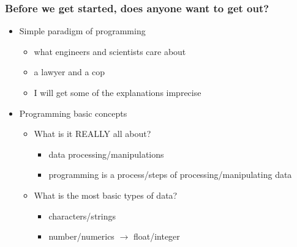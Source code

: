 \begin{frame}[fragile]
\frametitle{Before we get started, does anyone want to get out?}
\begin{itemize}
\item Simple paradigm of programming
\begin{itemize}
\item what engineers and scientists care about
\item a lawyer and a cop
\item I will get some of the explanations imprecise
\end{itemize}

\item Programming basic concepts
\begin{itemize}
\item What is it REALLY all about?
	\begin{itemize}
	\item data processing/manipulations
	\item programming is a process/steps of processing/manipulating data
	\end{itemize}

\item What is the most basic types of data?
	\begin{itemize}
	\item characters/strings
	\item number/numerics $\longrightarrow$ float/integer
	\end{itemize}

\end{itemize}

\end{itemize}

\end{frame}